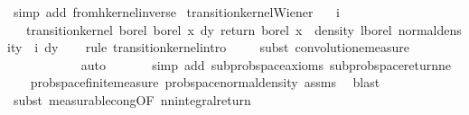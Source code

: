 \begin{isabellebody}
\ {\isacharparenleft}{\kern0pt}simp\ add{\isacharcolon}{\kern0pt}\ from{\isacharunderscore}{\kern0pt}hkernel{\isacharunderscore}{\kern0pt}inverse{\isacharparenright}{\kern0pt}%
\endisatagproof
{\isafoldproof}%
%
\isadelimproof
\isanewline
%
\endisadelimproof
\isanewline
{}\isamarkupfalse%
\ transition{\isacharunderscore}{\kern0pt}kernel{\isacharunderscore}{\kern0pt}Wiener{\isacharcolon}{\kern0pt}\isanewline
\ \ \ {\isachardoublequoteopen}i\ {\isachargreater}{\kern0pt}\ {}{\isachardoublequoteclose}\isanewline
\ \ \ {\isachardoublequoteopen}transition{\isacharunderscore}{\kern0pt}kernel\ borel\ borel\ {\isacharparenleft}{\kern0pt}{\isasymlambda}x\ dy{\isachardot}{\kern0pt}\ {\isacharparenleft}{\kern0pt}return\ borel\ x\ {\isasymstar}\ density\ lborel\ {\isacharparenleft}{\kern0pt}normal{\isacharunderscore}{\kern0pt}density\ {}\ i{\isacharparenright}{\kern0pt}{\isacharparenright}{\kern0pt}\ dy{\isacharparenright}{\kern0pt}{\isachardoublequoteclose}\isanewline
%
\isadelimproof
\ \ %
\endisadelimproof
%
\isatagproof
{}\isamarkupfalse%
\ {\isacharparenleft}{\kern0pt}rule\ transition{\isacharunderscore}{\kern0pt}kernel{\isachardot}{\kern0pt}intro{\isacharparenright}{\kern0pt}\isanewline
\ \ \ \isamarkupfalse%
\ {\isacharparenleft}{\kern0pt}subst\ convolution{\isacharunderscore}{\kern0pt}emeasure{\isacharparenright}{\kern0pt}\isanewline
\ \ \ \ \ \ \ \ \ \ \isamarkupfalse%
\ auto\isanewline
\ \ \ \ \ \isamarkupfalse%
\ {\isacharparenleft}{\kern0pt}simp\ add{\isacharcolon}{\kern0pt}\ subprob{\isacharunderscore}{\kern0pt}space{\isachardot}{\kern0pt}axioms{\isacharparenleft}{\kern0pt}{}{\isacharparenright}{\kern0pt}\ subprob{\isacharunderscore}{\kern0pt}space{\isacharunderscore}{\kern0pt}return{\isacharunderscore}{\kern0pt}ne{\isacharparenright}{\kern0pt}\isanewline
\ \ \isamarkupfalse%
\ prob{\isacharunderscore}{\kern0pt}space{\isachardot}{\kern0pt}finite{\isacharunderscore}{\kern0pt}measure\ prob{\isacharunderscore}{\kern0pt}space{\isacharunderscore}{\kern0pt}normal{\isacharunderscore}{\kern0pt}density\ assms\ \isamarkupfalse%
\ blast\isanewline
\ \ \ \isamarkupfalse%
\ {\isacharparenleft}{\kern0pt}subst\ measurable{\isacharunderscore}{\kern0pt}cong{\isacharbrackleft}{\kern0pt}OF\ nn{\isacharunderscore}{\kern0pt}integral{\isacharunderscore}{\kern0pt}return{\isacharbrackright}{\kern0pt}{\isacharparenright}{\kern0pt}\isanewline
\ \ \ \ \ \isamarkupfalse%

\end{isabellebody}
